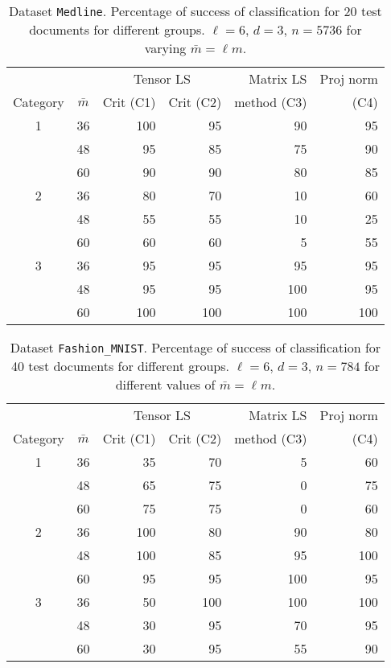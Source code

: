 \documentclass{siamart190516}
\begin{document}
\begin{table}
\centering
\begin{tabular}{|c|c|rr|r|r|}
\hline
 &  &  \multicolumn{2}{c|}{Tensor LS} & Matrix LS  & Proj norm\\
Category & $\bar m$ &   Crit (C1) & Crit (C2) & method (C3) &  (C4)\\
\hline
1 & 36 &  100 &95 & 90 &95 \\
  & 48 & 95 & 85 & 75 & 90 \\
  & 60 & 90 & 90 & 80 & 85 \\
\hline
2 & 36 &  80 &70 & 10 & 60 \\
  & 48 & 55 & 55 & 10 & 25 \\
  & 60 & 60 & 60 & 5 & 55 \\
  \hline
3 & 36 & 95 & 95 & 95 & 95 \\
  & 48 & 95 & 95 & 100 & 95 \\
  & 60 & 100 & 100 & 100 & 100 \\
  \hline
    \end{tabular}
    \caption{Dataset {\tt Medline}. Percentage of success of classification for 20 test documents for different groups.  $\ell=6$, $d=3$, $n=5736$ for varying $\bar m=\ell m$.\label{tab:med}}
\end{table}

\begin{table}%
\centering
\begin{tabular}{|c|c|rr|r|r|}
\hline
 &  &  \multicolumn{2}{c|}{Tensor LS} & Matrix LS  & Proj norm\\
Category & $\bar m$ &   Crit (C1) & Crit (C2) & method (C3) &  (C4)\\
\hline
1 & 36 & 35 & 70 & 5 & 60 \\
 & 48 & 65 & 75 & 0 & 75 \\
 & 60 & 75 & 75 & 0 & 60 \\
\hline
2 & 36 & 100 & 80 & 90 & 80 \\
 & 48 & 100 & 85 & 95 & 100 \\
 & 60 & 95 & 95 & 100 & 95 \\
  \hline
3 & 36 & 50 & 100 & 100 & 100 \\
 & 48 & 30 & 95 & 70 & 95 \\
 & 60 & 30 & 95 & 55 & 90 \\
  \hline
    \end{tabular}
    \caption{Dataset {\tt Fashion\_MNIST}. Percentage of success of classification for 40 test documents for different groups.  $\ell=6$, $d=3$, $n=784$ for different values of $\bar m=\ell m$.\label{tab:fashmnist}}
\end{table}
\end{document}
